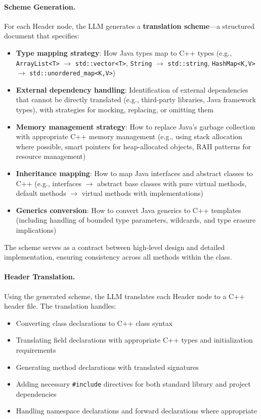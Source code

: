 \paragraph{Scheme Generation.} For each Header node, the LLM generates a \textbf{translation scheme}---a structured document that specifies:
\begin{itemize}
\item \textbf{Type mapping strategy}: How Java types map to C++ types (e.g., \texttt{ArrayList<T>} $\rightarrow$ \texttt{std::vector<T>}, \texttt{String} $\rightarrow$ \texttt{std::string}, \texttt{HashMap<K,V>} $\rightarrow$ \texttt{std::unordered\_map<K,V>})
\item \textbf{External dependency handling}: Identification of external dependencies that cannot be directly translated (e.g., third-party libraries, Java framework types), with strategies for mocking, replacing, or omitting them
\item \textbf{Memory management strategy}: How to replace Java's garbage collection with appropriate C++ memory management (e.g., using stack allocation where possible, smart pointers for heap-allocated objects, RAII patterns for resource management)
\item \textbf{Inheritance mapping}: How to map Java interfaces and abstract classes to C++ (e.g., interfaces $\rightarrow$ abstract base classes with pure virtual methods, default methods $\rightarrow$ virtual methods with implementations)
\item \textbf{Generics conversion}: How to convert Java generics to C++ templates (including handling of bounded type parameters, wildcards, and type erasure implications)
\end{itemize}

The scheme serves as a contract between high-level design and detailed implementation, ensuring consistency across all methods within the class.

\paragraph{Header Translation.} Using the generated scheme, the LLM translates each Header node to a C++ header file. The translation handles:
\begin{itemize}
\item Converting class declarations to C++ class syntax
\item Translating field declarations with appropriate C++ types and initialization requirements
\item Generating method declarations with translated signatures
\item Adding necessary \texttt{\#include} directives for both standard library and project dependencies
\item Handling namespace declarations and forward declarations where appropriate
\end{itemize}

